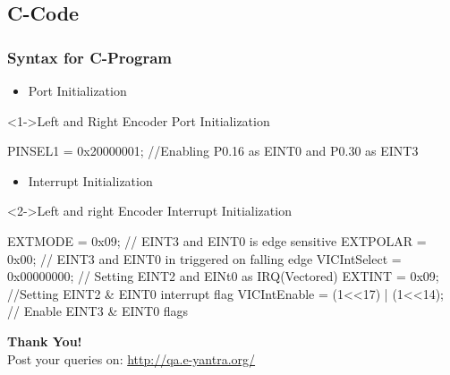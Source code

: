 \documentclass[table,10pt,red]{beamer}
\begin{document}
\subsection{C-Code}

\begin{frame}[shrink = 2,fragile]
	\frametitle{Syntax for C-Program} \pause
	\begin{itemize}
		\item Port Initialization
	\end{itemize}
		\begin{block}<1->{Left and Right Encoder Port Initialization}	\pause
		\begin{semiverbatim}
				\scriptsize{
							PINSEL1 = 0x20000001; \color{red}//Enabling P0.16 as EINT0  and P0.30 as EINT3\color{black}
						   }
			\end{semiverbatim}
		\end{block} \pause 
	\begin{itemize}
		\item Interrupt Initialization
	\end{itemize}
		\begin{block}<2->{Left and right Encoder Interrupt Initialization}	\pause
			\begin{semiverbatim}
					\scriptsize{
							EXTMODE = 0x09;	               \color{red}// EINT3 and EINT0 is edge sensitive\color{black}
							EXTPOLAR = 0x00;                \color{red}// EINT3 and EINT0 in triggered on falling edge\color{black}					
							VICIntSelect = 0x00000000;	     \color{red}// Setting EINT2 and EINt0 as IRQ(Vectored)\color{black}
							EXTINT = 0x09;                   \color{red}//Setting EINT2 \& EINT0 interrupt flag\color{black}
							VICIntEnable = (1<<17) | (1<<14); \color{red}// Enable EINT3 \& EINT0 flags\color{black}
						 }
			\end{semiverbatim}
		\end{block} \pause
\end{frame}

\begin{frame}
\hskip4cm
\textbf{\LARGE Thank You!} \\[20pt]
\hskip3cm
\scriptsize Post your queries on: 
\hyperref[www.e-yantra.org]{\color{blue} http://qa.e-yantra.org/ \color{black}} 
\end{frame}
\end{document}
